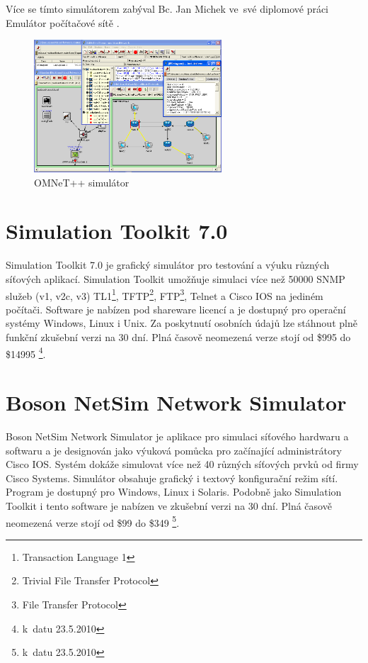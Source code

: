 Více se tímto simulátorem zabýval Bc. Jan Michek ve~své diplomové práci Emulátor počítačové sítě \cite{reserse:omnet_dp}.

\begin{figure}[h]
\begin{center}
\includegraphics[width=7cm]{figures/r_omnet}
\caption{OMNeT++ simulátor}
\label{fig:r_omnet}
\end{center}
\end{figure}


\section{Simulation Toolkit 7.0} 
Simulation Toolkit 7.0 \cite{reserse:adventnet} je grafický simulátor pro testování a výuku různých síťových aplikací. Simulation Toolkit umožňuje simulaci více než 50000 SNMP služeb (v1, v2c, v3) TL1\footnote{Transaction Language 1}, TFTP\footnote{Trivial File Transfer Protocol }, FTP\footnote{File Transfer Protocol}, Telnet a Cisco IOS na jediném počítači. Software je nabízen pod shareware licencí a je dostupný pro operační systémy Windows, Linux i Unix. Za poskytnutí osobních údajů lze stáhnout plně funkční zkušební verzi na 30 dní. Plná časově neomezená verze stojí od \$995 do \$14995 \footnote{k~datu 23.5.2010}.


\section{Boson NetSim Network Simulator} 
Boson NetSim Network Simulator \cite{reserse:boson} je aplikace pro simulaci síťového hardwaru a softwaru a je designován jako výuková pomůcka pro začínající administrátory Cisco IOS. Systém dokáže simulovat více než 40 různých síťových prvků od firmy Cisco Systems. Simulátor obsahuje grafický i textový konfigurační režim sítí. Program je dostupný pro Windows, Linux i Solaris. Podobně jako Simulation Toolkit i tento software je nabízen ve zkušební verzi na 30 dní. Plná časově neomezená verze stojí od \$99 do \$349 \footnote{k~datu 23.5.2010}.

